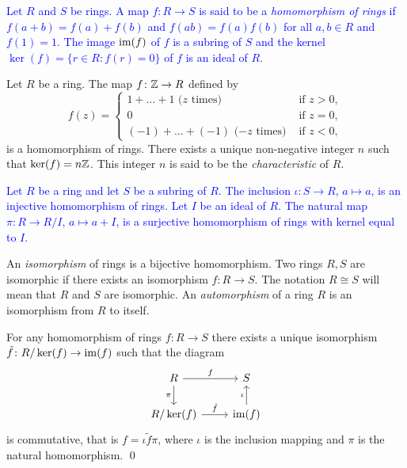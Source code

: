 \textcolor{blue}{
Let $R$ and $S$ be rings. A map $f\colon R\rightarrow S$
is said to be a {\em homomorphism of rings} if 
$f(a+b)=f(a)+f(b)$ and $f(ab)=f(a)f(b)$ for all $a,b\in R$ and $f(1)=1$.
The image $\operatorname{im}(f)$ of $f$ is a subring of $S$ and the kernel 
$\ker(f)=\{ r\in R: f(r)=0\}$ of $f$ is an ideal of $R$.}

\begin{example}
Let  $R$ be a ring. The map $f\colon \mathbb{Z}\rightarrow R$ defined by
\[
f(z)=\begin{cases}
    1+\dots +1\mbox{ ($z$ times)}&\mbox{ if } z>0,\\
    0 &\mbox{ if } z=0,\\
    (-1)+\dots+(-1) \mbox{ ($-z$ times)}&\mbox{ if } z<0,
    \end{cases}
\]
is a homomorphism of rings. There exists a unique non-negative integer $n$ such that
$\ker(f)=n\mathbb{Z}$. This integer $n$ is said to be the {\em characteristic} of $R$.
\end{example}

\begin{example} 
\textcolor{blue}{Let $R$ be a ring and let $S$ be a subring of $R$. The inclusion $\iota\colon S\rightarrow R$, $a\mapsto a$, is an injective homomorphism of rings. Let $I$ be an ideal of $R$. The natural map $\pi\colon R\rightarrow R/I$, $a\mapsto a+I$, is a surjective homomorphism of rings with kernel equal to $I$.}  
\end{example}


An {\em isomorphism} of rings is a bijective homomorphism. Two rings $R,S$ are isomorphic if there exists an isomorphism $f\colon R\rightarrow S$. The notation $R\cong S$ will mean that $R$ and $S$ are isomorphic. An {\em automorphism} of a ring $R$ is an isomorphism from $R$ to itself. 

\begin{theorem}
	For any homomorphism of rings $f\colon R\rightarrow S$ there exists a unique isomorphism 
	$\tilde f\colon R/\ker(f)\rightarrow\operatorname{im}(f)$ such that the diagram
	\[\begin{tikzcd}
		{R} & {S} \\
		{R/\ker(f)} & {\im(f)}
		\arrow["f", from=1-1, to=1-2]
		\arrow["{\pi}"', from=1-1, to=2-1]
		\arrow["{\iota}", from=2-2, to=1-2]
		\arrow["{\tilde f}", from=2-1, to=2-2]
	\end{tikzcd}
	\]
	is commutative, that is $f=\iota \tilde f\pi$, where $\iota$ 
	is the inclusion mapping and $\pi$ is the natural homomorphism. \qed	
\end{theorem} 

